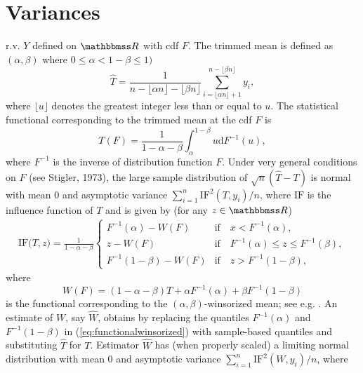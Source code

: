 \documentclass[a4paper,11pt]{scrreprt}
\begin{document}
\section{Variances}
r.v. $Y$ defined on $\R$ with cdf $F$. The trimmed mean is defined as $(\alpha,\beta)$ where $0 \leq \alpha < 1- \beta \leq 1)$
\begin{equation*}
   \widehat{T} = \frac{1}{n - \lfloor \alpha n\rfloor - \lfloor \beta n\rfloor}\sum_{i= \lfloor \alpha n \rfloor + 1}^{n - \lfloor \beta n \rfloor} y_i,
\end{equation*}
\noindent where $\lfloor u \rfloor$ denotes the greatest integer less than or equal to $u$. The statistical functional corresponding to the trimmed mean at the cdf $F$ is
\begin{equation*}
   T(F) = \frac{1}{1 - \alpha - \beta} \int_{\alpha}^{1-\beta} u \mathrm{d} F^{-1}(u), 
\end{equation*}
\noindent where $F^{-1}$ is the inverse of distribution function $F$. Under very general conditions on $F$ (see Stigler, 1973), the large sample distribution of $\sqrt{n}(\widehat{T} - T)$ is normal with mean 0 and asymptotic variance $\sum_{i=1}^n \mathrm{IF}^2(T,y_i)/n$, where $\mathrm{IF}$ is the influence function of $T$ and is given by (for any $z \in \R$) 
\begin{align*}
   \mathrm{IF}\big(T, z\big) = \frac{1}{1-\alpha - \beta}
   \begin{cases}
      F^{-1}(\alpha) - W(F) & \text{if} \quad x < F^{-1}(\alpha),\\
      z - W(F) & \text{if} \quad F^{-1}(\alpha) \leq z \leq F^{-1}(\beta),\\
      F^{-1}(1-\beta) - W(F) & \text{if} \quad z > F^{-1}(1-\beta), 
   \end{cases}
\end{align*}
\noindent where
\begin{equation}\label{eq:functionalwinsorized}
   W(F) = (1 - \alpha -\beta)T + \alpha F^{-1}(\alpha) + \beta F^{-1}(1-\beta)
\end{equation}
\noindent is the functional corresponding to the $(\alpha,\beta)$-winsorized mean; see e.g. \citet[][p. 58]{huber1981}. An estimate of $W$, say $\widehat{W}$, obtains by replacing the quantiles $F^{-1}(\alpha)$ and $F^{-1}(1-\beta)$ in (\ref{eq:functionalwinsorized}) with sample-based quantiles and substituting $\widehat{T}$ for $T$. Estimator $\widehat{W}$ has (when properly scaled) a limiting normal distribution with mean 0 and asymptotic variance $\sum_{i=1}^n \mathrm{IF}^2(W,y_i) / n$, where \citep[see e.g.][58--59]{huber1981}
\end{document}
